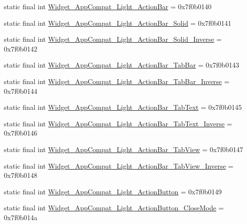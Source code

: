 \begin{CompactItemize}
\item 
static final int \hyperlink{classandroid_1_1support_1_1graphics_1_1drawable_1_1animated_1_1_r_1_1style_3c6ee762b34632a52b191a1cde156e99}{Widget\_\-AppCompat\_\-Light\_\-ActionBar} = 0x7f0b0140
\item 
static final int \hyperlink{classandroid_1_1support_1_1graphics_1_1drawable_1_1animated_1_1_r_1_1style_ceb682fc2a692782c041c242f2201ff6}{Widget\_\-AppCompat\_\-Light\_\-ActionBar\_\-Solid} = 0x7f0b0141
\item 
static final int \hyperlink{classandroid_1_1support_1_1graphics_1_1drawable_1_1animated_1_1_r_1_1style_769b396662dc5cc05ca0efa78dd13649}{Widget\_\-AppCompat\_\-Light\_\-ActionBar\_\-Solid\_\-Inverse} = 0x7f0b0142
\item 
static final int \hyperlink{classandroid_1_1support_1_1graphics_1_1drawable_1_1animated_1_1_r_1_1style_8e51cc619e9d706ebfcfee4bc49e052a}{Widget\_\-AppCompat\_\-Light\_\-ActionBar\_\-TabBar} = 0x7f0b0143
\item 
static final int \hyperlink{classandroid_1_1support_1_1graphics_1_1drawable_1_1animated_1_1_r_1_1style_e99aff339a7d45ed22f08171cc04f53c}{Widget\_\-AppCompat\_\-Light\_\-ActionBar\_\-TabBar\_\-Inverse} = 0x7f0b0144
\item 
static final int \hyperlink{classandroid_1_1support_1_1graphics_1_1drawable_1_1animated_1_1_r_1_1style_af6b51f3766c5ba9f0d7b96396fa785d}{Widget\_\-AppCompat\_\-Light\_\-ActionBar\_\-TabText} = 0x7f0b0145
\item 
static final int \hyperlink{classandroid_1_1support_1_1graphics_1_1drawable_1_1animated_1_1_r_1_1style_194c488a7f4750d80c6e576243eaf03d}{Widget\_\-AppCompat\_\-Light\_\-ActionBar\_\-TabText\_\-Inverse} = 0x7f0b0146
\item 
static final int \hyperlink{classandroid_1_1support_1_1graphics_1_1drawable_1_1animated_1_1_r_1_1style_9c0b0540c6d91c914bf42f8886aababe}{Widget\_\-AppCompat\_\-Light\_\-ActionBar\_\-TabView} = 0x7f0b0147
\item 
static final int \hyperlink{classandroid_1_1support_1_1graphics_1_1drawable_1_1animated_1_1_r_1_1style_b10e331427ae17131d721a581de7c2d8}{Widget\_\-AppCompat\_\-Light\_\-ActionBar\_\-TabView\_\-Inverse} = 0x7f0b0148
\item 
static final int \hyperlink{classandroid_1_1support_1_1graphics_1_1drawable_1_1animated_1_1_r_1_1style_a58328a957a109d54573514411deea02}{Widget\_\-AppCompat\_\-Light\_\-ActionButton} = 0x7f0b0149
\item 
static final int \hyperlink{classandroid_1_1support_1_1graphics_1_1drawable_1_1animated_1_1_r_1_1style_8873ea442f581cec47784b22a7c99e60}{Widget\_\-AppCompat\_\-Light\_\-ActionButton\_\-CloseMode} = 0x7f0b014a

\end{CompactItemize}
